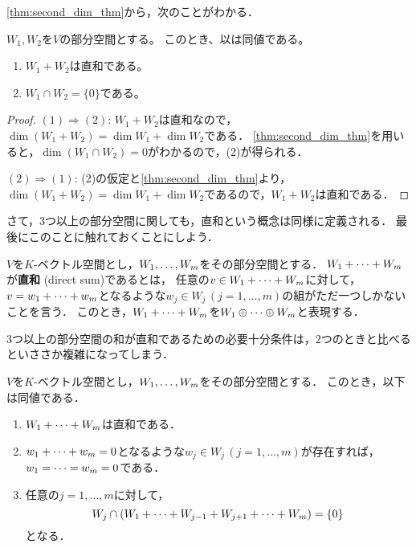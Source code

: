 \cref{thm:second_dim_thm}から，次のことがわかる．
\begin{prop}\label{prop:two_direct_sum}
  $W_1,W_2$を$V$の部分空間とする。
  このとき、以は同値である。
  \begin{enumerate}
    \item $W_1 + W_2$は直和である。
    \item $W_1 \cap W_2 = \{0\}$である。
  \end{enumerate}
\end{prop}
\begin{proof}
$(1) \Rightarrow (2)$:
$W_1 + W_2$は直和なので，$\dim (W_1 + W_2) = \dim W_1 + \dim W_2$である．
\cref{thm:second_dim_thm}を用いると，$\dim (W_1 \cap W_2) = 0$がわかるので，(2)が得られる．

$(2) \Rightarrow (1)$:
(2)の仮定と\cref{thm:second_dim_thm}より，$\dim (W_1 + W_2) = \dim W_1 + \dim W_2$であるので，$W_1 + W_2$は直和である．
\end{proof}
さて，3つ以上の部分空間に関しても，直和という概念は同様に定義される．
最後にこのことに触れておくことにしよう．
\begin{dfn}
  $V$を$K$-ベクトル空間とし，$\idxdot{W}{1}{m}$をその部分空間とする．
  $\idxsum{W}{1}{m}{+}$が\textbf{直和} (direct sum)であるとは，
  任意の$v \in \idxsum{W}{1}{m}{+}$に対して，
  $v = \idxsum{w}{1}{m}{+}$となるような$w_j \in W_j\,(j=1,\dots,m)$の組がただ一つしかないことを言う．
  このとき，$\idxsum{W}{1}{m}{+}$を$\idxsum{W}{1}{m}{\oplus}$と表現する．
\end{dfn}
3つ以上の部分空間の和が直和であるための必要十分条件は，2つのときと比べるといささか複雑になってしまう．
\begin{prop}
  $V$を$K$-ベクトル空間とし，$\idxdot{W}{1}{m}$をその部分空間とする．
  このとき，以下は同値である．
  \begin{enumerate}
    \item $\idxsum{W}{1}{m}{+}$は直和である．
    \item $\idxsum{w}{1}{m}{+}=0$となるような$w_j \in W_j\,(j=1,\dots,m)$が存在すれば，$\idxsum{w}{1}{m}{=}=0$である．
    \item 任意の$j = 1,\dots,m$に対して，
    \[
      W_j \cap (\idxsum{W}{1}{j-1}{+} + \idxsum{W}{j+1}{m}{+}) = \{ 0 \}  
    \]
    となる．
  \end{enumerate}
\end{prop}
